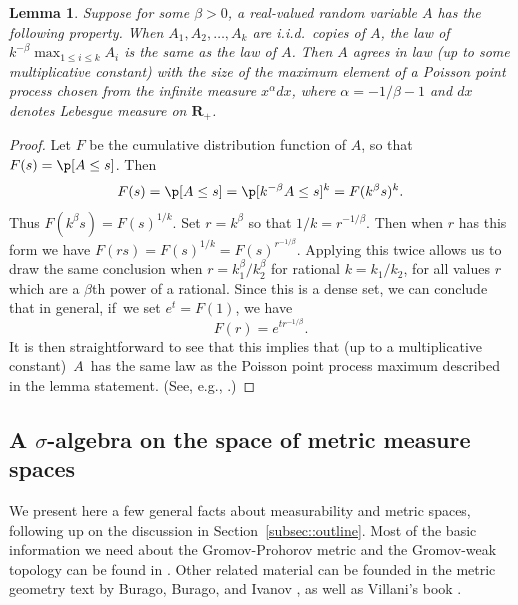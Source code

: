 \documentclass[10pt]{amsart}
\theoremstyle{plain}
\numberwithin{theorem}{section}
\newtheorem{lemma}[theorem]{Lemma}
\theoremstyle{definition}
\newcommand{\R}{\mathbf{R}}
\begin{document}
\begin{lemma}
\label{lem::stabilityundersuprema}
Suppose for some $\beta>0$, a real-valued random variable $A$ has the following property. When $A_1, A_2, \ldots, A_k$ are i.i.d.\ copies of $A$, the law of $k^{-\beta} \max_{1 \leq i \leq k} A_i$ is the same as the law of $A$. Then $A$ agrees in law (up to some multiplicative constant) with the size of the maximum element of a Poisson point process chosen from the infinite measure $x^{\alpha} dx$, where $\alpha= -1/\beta-1$ and $dx$ denotes Lebesgue measure on $\R_+$.
\end{lemma}
\begin{proof}
Let $F$ be the cumulative distribution function of $A$, so that $F(s) = \p[A \leq s]$. Then\vspace*{-3pt}
\[
F(s) = \p[ A \leq s] = \p[k^{-\beta} A \leq s]^k = F(k^\beta s)^k.
\]
Thus $F(k^\beta s) = F(s)^{1/k}$. Set $r =k^\beta$ so that $1/k = r^{-1/\beta}$. Then when $r$ has this form we have $F(r s) = F(s)^{1/k} = F(s)^{r^{-1/\beta}}$. Applying this twice allows us to draw the same conclusion when $r = k_1^\beta/ k_2^\beta$ for rational $k = k_1/k_2$, \ie for all values $r$ which are a $\beta$th power of a rational. Since this is a dense set, we can conclude that in general, if~we set $e^t = F(1)$, we have\vspace*{-3pt}
\begin{equation}
\label{eqn::a_dist_function}
F(r) = e^{t r^{-1/\beta}}.
\end{equation}
It is then straightforward to see that this implies that (up to a multiplicative constant)~$A$~has the same law as the Poisson point process maximum described in the lemma statement. (See, e.g., \cite[Exer.\,22.4]{satolevyprocesses}.)
\end{proof}

\subsection{A \texorpdfstring{$\sigma$}{s}-algebra on the space of metric measure spaces}
\label{subsec::mmsigma}

We present here a few general facts about measurability and metric spaces, following up on the discussion in Section~\ref{subsec::outline}. Most of the basic information we need about the Gromov-Prohorov metric and the Gromov-weak topology can be found in \cite{grevenpfaffelhuberwinter}. Other related material can be founded in the metric geometry text by Burago, Burago, and Ivanov \cite{courseinmetricgeometry}, as well as Villani's book \cite[Chaps.\,27-28]{villanibook}.
\end{document}
